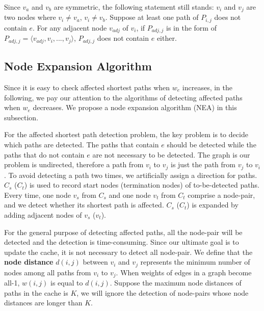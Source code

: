 Since $v_a$ and $v_b$ are symmetric, the following statement still stands: $v_i$ and $v_j$ are two nodes where $v_i\neq v_a$, $v_i\neq v_b$. Suppose at least one path of $P_{i,j}$ does not contain $e$.
For any adjacent node $v_{adj}$ of $v_i$, if $P_{{adj},j}$ is in the form of $P_{adj,j}=\langle v_{adj},v_i,...,v_j\rangle$, $P_{adj,j}$ does not contain $e$ either.
\subsection{Node Expansion Algorithm}
Since it is easy to check affected shortest paths when $w_e$ increases, in the following, we pay our attention to the algorithms of detecting affected paths when $w_e$ decreases.
We propose a node expansion algorithm (NEA) in this subsection.

For the affected shortest path detection problem, the key problem is to decide which paths are detected. The paths that contain $e$ should be detected while the paths that do not contain $e$ are not necessary to be detected.
The graph is our problem is undirected, therefore a path from $v_i$ to $v_j$ is just the path from $v_j$ to $v_i$. To avoid detecting a path two times, we artificially assign a direction for paths.
$C_s$ ($C_t$) is used to record start nodes (termination nodes) of to-be-detected paths.
Every time, one node $v_s$ from $C_s$ and one node $v_t$ from $C_t$ comprise a node-pair, and we detect whether its shortest path is affected. $C_s$ ($C_t$) is expanded by adding adjacent nodes of $v_s$ ($v_t$).

For the general purpose of detecting affected paths, all the node-pair will be detected and the detection is time-consuming. Since our ultimate goal is to update the cache, it is not necessary to detect all node-pair. We define that the \textbf{node distance} $d(i,j)$ between $v_i$ and $v_j$ represents the minimum number of nodes among all paths from $v_i$ to $v_j$. When weights of edges in a graph become all-1, $w(i,j)$ is equal to $d(i,j)$.
Suppose the maximum node distances of paths in the cache is $K$, we will ignore the detection of node-pairs whose node distances are longer than $K$.

